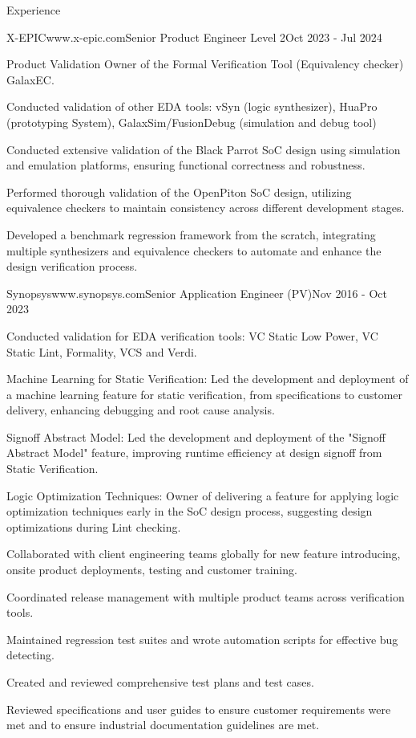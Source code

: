 \documentclass[
11pt, %
]{./assets/resume} %
\begin{document}
\begin{rSection}{Experience}
	\begin{rSubsectionX}{X-EPIC}{www.x-epic.com}{Senior Product Engineer Level 2}{Oct 2023 - Jul 2024}
		\item Product Validation Owner of the Formal Verification Tool (Equivalency checker) GalaxEC.
		\item Conducted validation of other EDA tools: vSyn (logic synthesizer), HuaPro (prototyping System), GalaxSim/FusionDebug (simulation and debug tool)
		\item Conducted extensive validation of the Black Parrot SoC design using simulation and emulation platforms, ensuring functional correctness and robustness.
		\item Performed thorough validation of the OpenPiton SoC design, utilizing equivalence checkers to maintain consistency across different development stages.
		\item Developed a benchmark regression framework from the scratch, integrating multiple synthesizers and equivalence checkers to automate and enhance the design verification process.
	\end{rSubsectionX}
	\begin{rSubsectionX}{Synopsys}{www.synopsys.com}{Senior Application Engineer (PV)}{Nov 2016 - Oct 2023}
		\item Conducted validation for EDA verification tools: VC Static Low Power, VC Static Lint, Formality, VCS and Verdi.
		\item Machine Learning for Static Verification: Led the development and deployment of a machine learning feature for static verification, from specifications to customer delivery, enhancing debugging and root cause analysis.
		\item Signoff Abstract Model: Led the development and deployment of the "Signoff Abstract Model" feature, improving runtime efficiency at design signoff from Static Verification.
		\item Logic Optimization Techniques: Owner of delivering a feature for applying logic optimization techniques early in the SoC design process, suggesting design optimizations during Lint checking.
		\item Collaborated with client engineering teams globally for new feature introducing, onsite product deployments, testing and customer training. 
		\item Coordinated release management with multiple product teams across verification tools. 
		\item Maintained regression test suites and wrote automation scripts for effective bug detecting.
		\item Created and reviewed comprehensive test plans and test cases.
		\item Reviewed specifications and user guides to ensure customer requirements were met and to ensure industrial documentation guidelines are met.
	\end{rSubsectionX}
\end{rSection}
\end{document}
